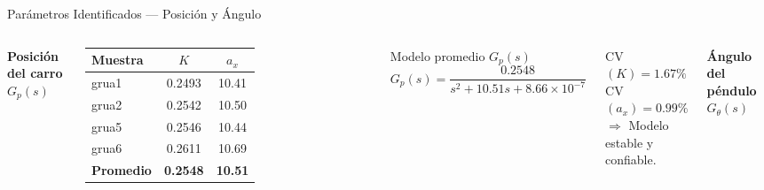 \documentclass[mathserif,spanish,10pt]{beamer}
\begin{document}
\begin{frame}{Parámetros Identificados — Posición y Ángulo}
\begin{columns}[T]

  {\centering\small\color{navyblue}\textbf{Posición del carro} $G_p(s)$\par}
  \vspace{4pt}
  
  \begin{table}
    \centering
    \scriptsize
    \begin{tabular}{lcc}
      \hline
      \rowcolor{rowhdr}
      \color{white}\textbf{Muestra} &
      \color{white}$K$ &
      \color{white}$a_x$ \\
      \hline
      grua1 & 0.2493 & 10.41 \\
      grua2 & 0.2542 & 10.50 \\
      grua5 & 0.2546 & 10.44 \\
      grua6 & 0.2611 & 10.69 \\
      \rowcolor{accentteal!20}
      \textbf{Promedio} & \textbf{0.2548} & \textbf{10.51} \\
      \hline
    \end{tabular}
  \end{table}

  \vspace{-2pt}
  \begin{block}{Modelo promedio $G_p(s)$}
    \centering\scriptsize
    \[
      G_p(s) = \frac{0.2548}{s^2 + 10.51s + 8.66\times10^{-7}}
    \]
  \end{block}

  \vspace{-2pt}
  {\centering\fontsize{7pt}{8pt}\selectfont
  CV$(K)=1.67\%$ \quad CV$(a_x)=0.99\%$\\
  $\Rightarrow$ Modelo estable y confiable.\par}

  {\centering\small\color{navyblue}\textbf{Ángulo del péndulo} $G_\theta(s)$\par}
  \vspace{4pt}


\end{columns}
\end{frame}
\end{document}
